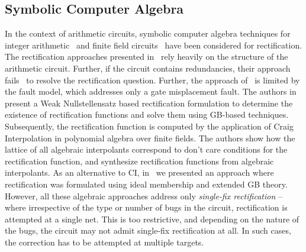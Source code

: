 
\subsection{Symbolic Computer Algebra}

In the context of arithmetic circuits, symbolic computer algebra 
techniques for integer arithmetic~\cite{farimah:2016:1,farimah:2017:1,
MF_Rolf:ISVLSI18} and finite field circuits~\cite{Utkarsh:ETS19,
Utkarsh:VLSI18,Vkrao:FMCAD18} have been considered for rectification. 
The rectification approaches presented in~\cite{farimah:2016:1,farimah:2017:1} 
rely heavily on the structure of the arithmetic circuit. Further,
if the circuit contains redundancies, their approach 
fails~\cite{farimah_cex} to resolve the rectification question. 
Further, the approach of~\cite{MF_Rolf:ISVLSI18} is limited by the fault model,
which addresses only a gate misplacement fault.
The authors in~\cite{Utkarsh:ETS19,Utkarsh:VLSI18} present a Weak 
Nullstellensatz based rectification formulation to determine the existence of 
rectification functions and solve them using GB-based techniques. 
Subsequently, the rectification function is computed by the application of 
Craig Interpolation in polynomial algebra over finite fields. 
The authors show how the lattice of all algebraic interpolants 
correspond to don't care conditions for the rectification function, and synthesize
rectification functions from algebraic interpolants.
As an alternative to CI, in~\cite{Vkrao:FMCAD18} we presented an approach where
rectification was formulated using ideal membership and extended GB theory.
However, all these algebraic approaches address only {\it single-fix 
rectification} -- where irrespective of the type or number of bugs in the circuit, rectification is attempted at a single net. This is too restrictive, and depending on the nature of the bugs, the circuit may not admit single-fix rectification at all. In such cases, 
the correction has to be attempted at multiple targets.

